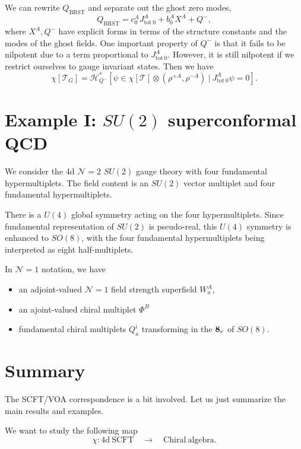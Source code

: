 \documentclass[a4paper,11pt]{article}
\begin{document}
We can rewrite $Q_\mathrm{BRST}$ and separate out the ghost zero modes,
\begin{equation}
    Q_\mathrm{BRST} = c_0^A J^A_{\mathrm{tot}~0} + b_0^A X^A + Q^-,
\end{equation}
where $X^A, Q^-$ have explicit forms in terms of the structure constants and the modes of the ghost fields. One important property of $Q^-$ is that it fails to be nilpotent due to a term proportional to $J^A_{\mathrm{tot}~0}$. However, it is still nilpotent if we restrict ourselves to gauge invariant states. Then we have
\begin{equation}
    \chi[\mathcal{T}_G] = \mathcal{H}^*_{Q^-}[\psi \in \chi[\mathcal{T}] \otimes (\rho^{+A}, \rho^{-A}) \:|\: J^A_{\mathrm{tot}~0} \psi = 0].
\end{equation}

\section{Example I: $SU(2)$ superconformal QCD}
We consider the 4d $\mathcal{N}=2$ $SU(2)$ gauge theory with four fundamental hypermultiplets. The field content is an $SU(2)$ vector multiplet and four fundamental hypermultiplets.

There is a $U(4)$ global symmetry acting on the four hypermultiplets. Since fundamental representation of $SU(2)$ is pseudo-real, this $U(4)$ symmetry is enhanced to $SO(8)$, with the four fundamental hypermultiplets being interpreted as eight half-multiplets.

In $\mathcal{N}=1$ notation, we have
\begin{itemize}
    \item an adjoint-valued $\mathcal{N}=1$ field strength superfield $W_a^A$,
    \item an ajoint-valued chiral multiplet $\Phi^B$
    \item fundamental chiral multiplets $Q_a^i$ transforming in the ${\bf 8}_v$ of $SO(8)$.
\end{itemize}


\newpage
\section{Summary}
The SCFT/VOA correspondence is a bit involved. Let us just summarize the main results and examples.

We want to study the following map
\begin{equation}
    \chi: \mathrm{4d~SCFT} \quad \to \quad \mathrm{Chiral~algebra}.
\end{equation}
\end{document}
